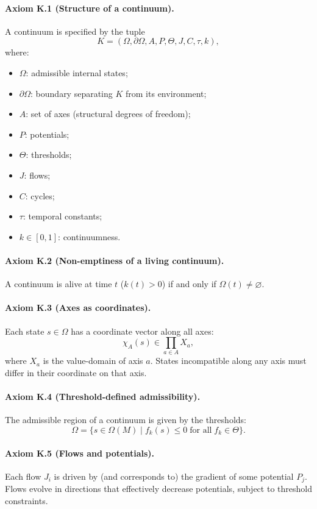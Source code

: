 \paragraph{Axiom K.1 (Structure of a continuum).}
A continuum is specified by the tuple
\[
  K = (\Omega,\partial\Omega,A,P,\Theta,J,C,\tau,k),
\]
where:
\begin{itemize}
  \item \(\Omega\): admissible internal states;
  \item \(\partial\Omega\): boundary separating \(K\) from its environment;
  \item \(A\): set of axes (structural degrees of freedom);
  \item \(P\): potentials;
  \item \(\Theta\): thresholds;
  \item \(J\): flows;
  \item \(C\): cycles;
  \item \(\tau\): temporal constants;
  \item \(k\in[0,1]\): continuumness.
\end{itemize}

\paragraph{Axiom K.2 (Non-emptiness of a living continuum).}
A continuum is alive at time \(t\) (\(k(t)>0\)) if and only if \(\Omega(t)\neq \varnothing\).

\paragraph{Axiom K.3 (Axes as coordinates).}
Each state \(s\in\Omega\) has a coordinate vector along all axes:
\[
  \chi_A(s)\in \prod_{a\in A} X_a,
\]
where \(X_a\) is the value-domain of axis \(a\).
States incompatible along any axis must differ in their coordinate on that axis.

\paragraph{Axiom K.4 (Threshold-defined admissibility).}
The admissible region of a continuum is given by the thresholds:
\[
  \Omega = \{ s\in\Omega(M)\mid f_k(s)\le 0 \;\text{for all}\; f_k\in \Theta\}.
\]

\paragraph{Axiom K.5 (Flows and potentials).}
Each flow \(J_i\) is driven by (and corresponds to) the gradient of some potential \(P_j\).
Flows evolve in directions that effectively decrease potentials, subject to threshold constraints.

